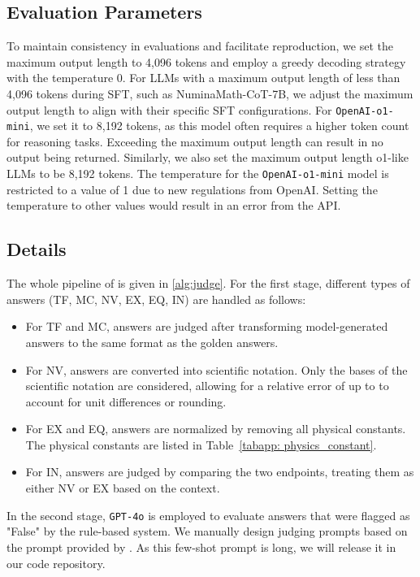 \subsection{Evaluation Parameters}\label{app: parameters}

To maintain consistency in evaluations and facilitate reproduction, we set the maximum output length to 4,096 tokens and employ a greedy decoding strategy with the temperature 0.
For LLMs with a maximum output length of less than 4,096 tokens during SFT, such as NuminaMath-CoT-7B, we adjust the maximum output length to align with their specific SFT configurations.
For \texttt{OpenAI-o1-mini}, we set it to 8,192 tokens, as this model often requires a higher token count for reasoning tasks. 
Exceeding the maximum output length can result in no output being returned.
Similarly, we also set the maximum output length o1-like LLMs to be 8,192 tokens.
The temperature for the \texttt{OpenAI-o1-mini} model is restricted to a value of 1 due to new regulations from OpenAI. 
Setting the temperature to other values would result in an error from the API.




\subsection{{\judge} Details}\label{app: constants}

The whole pipeline of {\judge} is given in \cref{alg:judge}.
For the first stage, different types of answers (TF, MC, NV, EX, EQ, IN) are handled as follows:
\begin{itemize}
    \item For TF and MC, answers are judged after transforming model-generated answers to the same format as the golden answers.
    \item For NV, answers are converted into scientific notation. 
    Only the bases of the scientific notation are considered, allowing for a relative error of up to to account for unit differences or rounding.
    \item For EX and EQ, answers are normalized by removing all physical constants.
    The physical constants are listed in Table~\ref{tabapp: physics_constant}.
    \item For IN, answers are judged by comparing the two endpoints, treating them as either NV or EX based on the context.
\end{itemize}
In the second stage, \texttt{GPT-4o} is employed to evaluate answers that were flagged as "False" by the rule-based system. 
We manually design judging prompts based on the prompt provided by \citet{omnimath2024gao}.
As this few-shot prompt is long, we will release it in our code repository.


